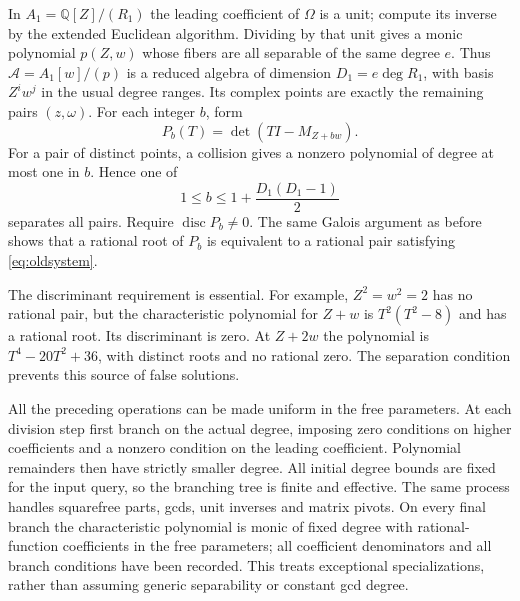 \documentclass[11pt,reqno]{amsart}
\theoremstyle{definition}
\numberwithin{equation}{section}
\newcommand{\Q}{\mathbb Q}
\newcommand{\disc}{\operatorname{disc}}
\def\f{\frac}
\begin{document}
In $A_1=\Q[Z]/(R_1)$ the leading coefficient of $\Omega$ is a unit; compute its inverse by the extended Euclidean algorithm. Dividing by that unit gives a monic polynomial $p(Z,w)$ whose fibers are all separable of the same degree $e$. Thus
$ \mathcal A=A_1[w]/(p)$
is a reduced algebra of dimension $D_1=e\deg R_1$, with basis $Z^iw^j$ in the usual degree ranges. Its complex points are exactly the remaining pairs $(z,\omega)$. For each integer $b$, form
\begin{equation}\label{eq:pairchar}
 P_b(T)=\det(TI-M_{Z+bw}).
\end{equation}
For a pair of distinct points, a collision gives a nonzero polynomial of degree at most one in $b$. Hence one of
\[
 1\le b\le1+\f{D_1(D_1-1)}2
\]
separates all pairs. Require $\disc P_b\ne0$. The same Galois argument as before shows that a rational root of $P_b$ is equivalent to a rational pair satisfying \eqref{eq:oldsystem}.

The discriminant requirement is essential. For example, $Z^2=w^2=2$ has no rational pair, but the characteristic polynomial for $Z+w$ is $T^2(T^2-8)$ and has a rational root. Its discriminant is zero. At $Z+2w$ the polynomial is $T^4-20T^2+36$, with distinct roots and no rational zero. The separation condition prevents this source of false solutions.

All the preceding operations can be made uniform in the free parameters. At each division step first branch on the actual degree, imposing zero conditions on higher coefficients and a nonzero condition on the leading coefficient. Polynomial remainders then have strictly smaller degree. All initial degree bounds are fixed for the input query, so the branching tree is finite and effective. The same process handles squarefree parts, gcds, unit inverses and matrix pivots. On every final branch the characteristic polynomial is monic of fixed degree with rational-function coefficients in the free parameters; all coefficient denominators and all branch conditions have been recorded. This treats exceptional specializations, rather than assuming generic separability or constant gcd degree.
\end{document}
